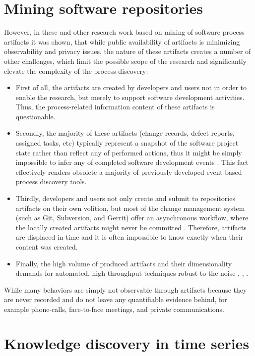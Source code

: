 \section{Mining software repositories}
However, in these and other research work based on mining of software process artifacts it was shown, 
that while public availability of artifacts is minimizing observability and privacy issues, the nature 
of these artifacts creates a number of other challenges, which limit the possible scope of the research 
and significantly elevate the complexity of the process discovery:
\begin{itemize}
\item First of all, the artifacts are created by developers and users not in order to enable the research,
but merely to support software development activities. Thus, the process-related information content of these
artifacts is questionable.
\item Secondly, the majority of these artifacts (change records, defect reports, assigned tasks, etc) 
typically represent a snapshot of the software project state rather than reflect any of performed actions, 
thus it might be simply impossible to infer any of completed software development events \cite{citeulike:1296888}.
This fact effectively renders obsolete a majority of previously developed event-based process discovery tools.
\item Thirdly, developers and users not only create and submit to repositories artifacts on their own volition,
but most of the change management system (such as Git, Subversion, and Gerrit) offer an asynchronous workflow, 
where the locally created artifacts might never be committed \cite{citeulike:2280690} \cite{citeulike:9037939}. 
Therefore, artifacts are displaced in time and it is often impossible to know exactly when their content was created.
\item Finally, the high volume of produced artifacts and their dimensionality demands for automated, high throughput 
techniques robust to the noise \cite{citeulike:12550438}, \cite{citeulike:7853299}, \cite{citeulike:4534888}.
\end{itemize}

While many behaviors are simply not observable through artifacts because they are never recorded
and do not leave any quantifiable evidence behind, for example phone-calls, face-to-face meetings, and 
private communications. 

\section{Knowledge discovery in time series}
